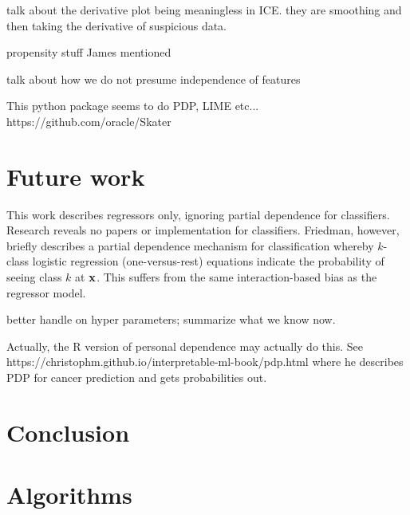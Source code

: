 \documentclass[12pt]{article}
\begin{document}
talk about the derivative plot being meaningless in ICE.  they are smoothing and then taking the derivative of suspicious data.
 
propensity stuff James mentioned

talk about how we do not presume independence of features
 
This python package seems to do PDP, LIME etc... https://github.com/oracle/Skater

\section{Future work}

This work describes regressors only, ignoring partial dependence for classifiers.  Research reveals no papers or implementation for classifiers. Friedman, however, briefly describes a partial dependence mechanism for classification whereby $k$-class logistic regression (one-versus-rest) equations indicate the probability of seeing class $k$ at $\bf{x}$.  This suffers from the same interaction-based bias as the regressor model.

better handle on hyper parameters; summarize what we know now.

Actually, the R version of personal dependence may actually do this. See https://christophm.github.io/interpretable-ml-book/pdp.html where he describes PDP for cancer prediction and gets probabilities out.

\section{Conclusion}
\label{sec:conc}

\section{Algorithms}
\end{document}
